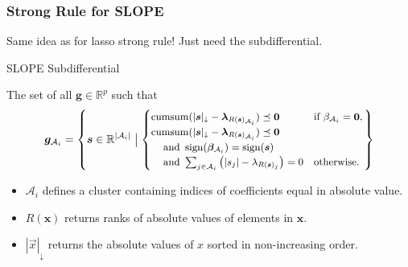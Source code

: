 \documentclass[10pt]{beamer}
\begin{document}
\begin{frame}[c]
  \frametitle{Strong Rule for SLOPE}

  Same idea as for lasso strong rule! Just need the subdifferential.


  \begin{block}{SLOPE Subdifferential}

    The set of all \(\bm{g} \in \mathbb{R}^p\) such that
    \[
      \small
      \bm{g}_{\mathcal{A}_i} =
      \left\{\bm{s} \in \mathbb{R}^{|{\mathcal{A}_i}|} \bigm\vert
        \begin{cases}
          \mathop{\mathrm{cumsum}}(|\bm{s}|_\downarrow - \bm{\lambda}_{R(\bm{s})_{\mathcal{A}_i}}) \preceq \mathbf{0} & \text{if } \beta_{\mathcal{A}_i} = \mathbf{0}, \\
          \mathop{\mathrm{cumsum}}(|\bm{s}|_\downarrow - \bm{\lambda}_{R(\bm{s})_{\mathcal{A}_i}}) \preceq \mathbf{0}                                                  \\
          \quad\,\text{and } \operatorname{sign}(\bm{\beta}_{\mathcal{A}_i}) = \operatorname{sign}(\bm{s})                                                                                         \\
          \quad\,\text{and } \sum_{j \in \mathcal{A}_i}\left(|s_j| - \lambda_{R(\bm{s})_j}\right) = 0                 & \text{otherwise.}
        \end{cases}
      \right\}
    \]
  \end{block}

  \medskip

  \begin{itemize}
    \item \(\mathcal{A}_i\) defines a \alert{cluster} containing indices of coefficients
          equal in absolute value.
    \item \(R(\bm{x})\) returns \alert{ranks} of absolute values of elements in \(\bm{x}\).
    \item \(|\vec{x}|_\downarrow\) returns the absolute values of \(x\) sorted in non-increasing
          order.
  \end{itemize}

\end{frame}
\end{document}
